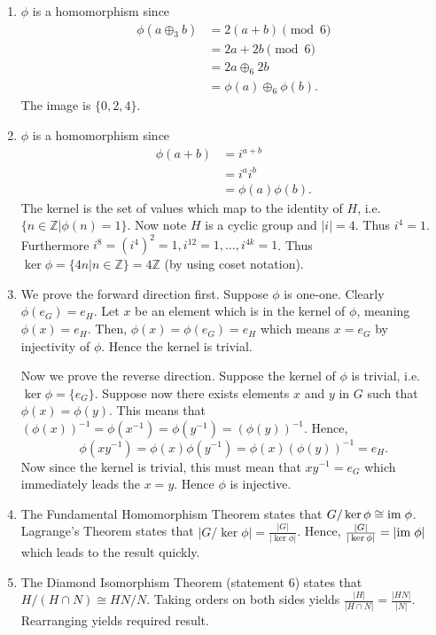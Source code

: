 \begin{enumerate}
    \item $\phi$ is a homomorphism since
    \begin{align*}
        \phi(a \oplus_3 b) &= 2(a+b) \pmod{6}\\
        &= 2a + 2b \pmod{6}\\
        &= 2a \oplus_6 2b\\
        &= \phi(a) \oplus_6 \phi(b).
    \end{align*}
    The image is $\{0, 2, 4\}$.

    \item $\phi$ is a homomorphism since
    \begin{align*}
        \phi(a+b) &= i^{a+b}\\
        &=i^ai^b\\
        &=\phi(a)\phi(b).
    \end{align*}
    The kernel is the set of values which map to the identity of $H$, i.e. $\{n \in \mathbb{Z} \vert \phi(n) = 1\}$. Now note $H$ is a cyclic group and $|i| = 4$. Thus $i^4 = 1$. Furthermore $i^8 = (i^4)^2 = 1, i^{12} = 1, \dots, i^{4k} = 1$. Thus $\ker\phi = \{4n \vert n \in \mathbb{Z}\} = 4\mathbb{Z}$ (by using coset notation).

    \item We prove the forward direction first. Suppose $\phi$ is one-one. Clearly $\phi(e_G) = e_H$. Let $x$ be an element which is in the kernel of $\phi$, meaning $\phi(x) = e_H$. Then, $\phi(x) = \phi(e_G) = e_H$ which means $x = e_G$ by injectivity of $\phi$. Hence the kernel is trivial.

    Now we prove the reverse direction. Suppose the kernel of $\phi$ is trivial, i.e. $\ker \phi = \{e_G\}$. Suppose now there exists elements $x$ and $y$ in $G$ such that $\phi(x) = \phi(y)$. This means that $(\phi(x))^{-1} = \phi(x^{-1}) = \phi(y^{-1}) = (\phi(y))^{-1}$. Hence,
    \[
        \phi(xy^{-1}) = \phi(x)\phi(y^{-1}) = \phi(x)\left(\phi(y)\right)^{-1} = e_H.
    \]
    Now since the kernel is trivial, this must mean that $xy^{-1} = e_G$ which immediately leads the $x=y$. Hence $\phi$ is injective.

    \item The Fundamental Homomorphism Theorem states that $G / \ker \phi \cong \mathrm{im}\; \phi$. Lagrange's Theorem states that $|G / \ker \phi| = \frac{|G|}{|\ker\phi|}$. Hence, $\frac{|G|}{|\ker\phi|} = |\mathrm{im}\;\phi|$ which leads to the result quickly.

    \item The Diamond Isomorphism Theorem (statement 6) states that $H / (H\cap N) \cong HN / N$. Taking orders on both sides yields $\frac{|H|}{|H \cap N|} = \frac{|HN|}{|N|}$. Rearranging yields required result.


\end{enumerate}
